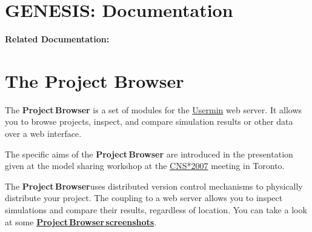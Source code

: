 \documentclass[12pt]{article}
\begin{document}
\section*{GENESIS: Documentation}

{\bf Related Documentation:}

\section*{The Project Browser}

The {\bf Project\,Browser} is a set of modules for the \href{http://www.webmin.com/usermin.html}{Usermin} web server. It allows you to browse projects, inspect, and compare simulation results or other data over a web interface.

The specific aims of the {\bf Project\,Browser} are introduced in the presentation given at the model sharing workshop at the \href{../cns07-poster/cns07-poster.pdf}{CNS*2007} meeting in Toronto.

The {\bf Project\,Browser}uses distributed version control mechanisms to physically distribute your project. The coupling to a web server allows you to inspect simulations and compare their results, regardless of location. You can take a look at some \href{../project-browser-screenshots/project-browser-screenshots.tex}{\bf Project\,Browser\,screenshots}. 
\end{document}
